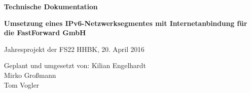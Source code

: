 \begin{titlepage}
	\begin{center}
		{\Large{\bf Technische Dokumentation}}
	\end{center}
\vspace{2cm}
	\begin{center}
		{\LARGE{\bf Umsetzung eines IPv6-Netzwerksegmentes mit Internetanbindung für die FastForward GmbH}}
	\end{center}
\vspace{1cm}
	\begin{center}
		Jahresprojekt der FS22 HHBK, 20. April 2016
	\end{center}
\vfill
	\begin{flushleft}
		Geplant und umgesetzt von:\newline
		Kilian Engelhardt \\
		Mirko Großmann \\
		Tom Vogler
	\end{flushleft}
\end{titlepage}

